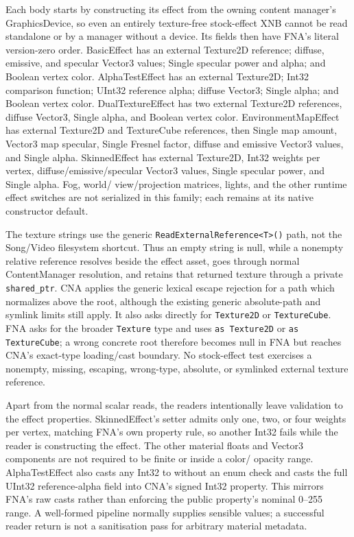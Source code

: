 Each body starts by constructing its effect from the owning content manager's GraphicsDevice, so
even an entirely texture-free stock-effect XNB cannot be read standalone or by a manager without a
device.  Its fields then have FNA's literal version-zero order.  BasicEffect has an external
Texture2D reference; diffuse, emissive, and specular Vector3 values; Single specular power and
alpha; and Boolean vertex color.  AlphaTestEffect has an external Texture2D; Int32 comparison
function; UInt32 reference alpha; diffuse Vector3; Single alpha; and Boolean vertex color.
DualTextureEffect has two external Texture2D references, diffuse Vector3, Single alpha, and
Boolean vertex color.  EnvironmentMapEffect has external Texture2D and TextureCube references,
then Single map amount, Vector3 map specular, Single Fresnel factor, diffuse and emissive Vector3
values, and Single alpha.  SkinnedEffect has external Texture2D, Int32 weights per vertex,
diffuse/emissive/specular Vector3 values, Single specular power, and Single alpha.  Fog, world/
view/projection matrices, lights, and the other runtime effect switches are not serialized in this
family; each remains at its native constructor default.

The texture strings use the generic \texttt{ReadExternalReference<T>()} path, not the Song/Video
filesystem shortcut.  Thus an empty string is null, while a nonempty relative reference resolves
beside the effect asset, goes through normal ContentManager resolution, and retains that returned
texture through a private \texttt{shared\_ptr}.  CNA applies the generic lexical escape rejection
for a path which normalizes above the root, although the existing generic absolute-path and
symlink limits still apply.  It also asks directly for \texttt{Texture2D} or \texttt{TextureCube}.
FNA asks for the broader \texttt{Texture} type and uses \texttt{as Texture2D} or
\texttt{as TextureCube}; a wrong concrete root therefore becomes null in FNA but reaches CNA's
exact-type loading/cast boundary.  No stock-effect test exercises a nonempty, missing, escaping,
wrong-type, absolute, or symlinked external texture reference.

Apart from the normal scalar reads, the readers intentionally leave validation to the effect
properties.  SkinnedEffect's setter admits only one, two, or four weights per vertex, matching
FNA's own property rule, so another Int32 fails while the reader is constructing the effect.
The other material floats and Vector3 components are not required to be finite or inside a color/
opacity range.  AlphaTestEffect also casts any Int32 to  without an enum
check and casts the full UInt32 reference-alpha field into CNA's signed Int32 property.  This
mirrors FNA's raw casts rather than enforcing the public property's nominal 0--255 range.  A
well-formed pipeline normally supplies sensible values; a successful reader return is not a
sanitisation pass for arbitrary material metadata.


